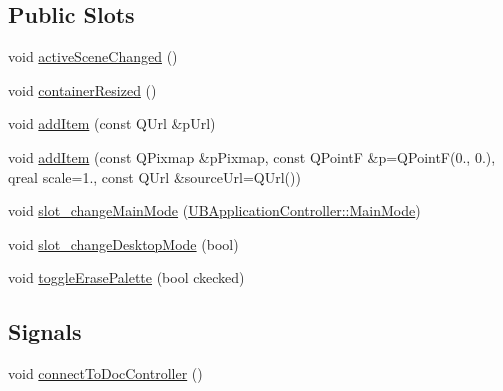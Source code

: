 \subsection*{Public Slots}
\begin{DoxyCompactItemize}
\item 
void \hyperlink{class_u_b_board_palette_manager_abd4b0d70c42a21f9cad5e87f5de85b82}{active\-Scene\-Changed} ()
\item 
void \hyperlink{class_u_b_board_palette_manager_ae6c1074d6b9fffe113dde7a543f7a460}{container\-Resized} ()
\item 
void \hyperlink{class_u_b_board_palette_manager_af6c40f066242ce9ef1927b5684dc1fa5}{add\-Item} (const Q\-Url \&p\-Url)
\item 
void \hyperlink{class_u_b_board_palette_manager_a38750a722517f9e75799bd434739d9e0}{add\-Item} (const Q\-Pixmap \&p\-Pixmap, const Q\-Point\-F \&p=Q\-Point\-F(0., 0.), qreal scale=1., const Q\-Url \&source\-Url=Q\-Url())
\item 
void \hyperlink{class_u_b_board_palette_manager_a36b62f79ec7e8ecb4da952faf8e0ba56}{slot\-\_\-change\-Main\-Mode} (\hyperlink{class_u_b_application_controller_a72ac04dd6883ac94b53e8e1dcdf2af39}{U\-B\-Application\-Controller\-::\-Main\-Mode})
\item 
void \hyperlink{class_u_b_board_palette_manager_ac34e34de42e7826f10b024d97aeccd3b}{slot\-\_\-change\-Desktop\-Mode} (bool)
\item 
void \hyperlink{class_u_b_board_palette_manager_a118cccd08976f403b2bf6a10a07f01d7}{toggle\-Erase\-Palette} (bool ckecked)
\end{DoxyCompactItemize}
\subsection*{Signals}
\begin{DoxyCompactItemize}
\item 
void \hyperlink{class_u_b_board_palette_manager_a420304b3f9b0f0172e3eb844f8d2fd8b}{connect\-To\-Doc\-Controller} ()
\end{DoxyCompactItemize}
